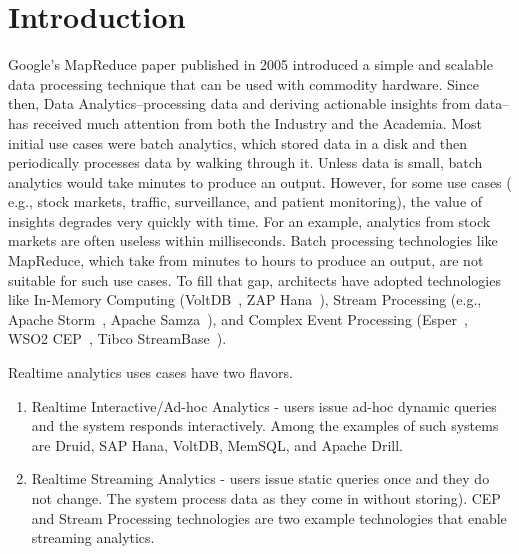 \documentclass{sig-alternate}
\begin{document}





\section{Introduction}

Google's MapReduce paper published in 2005 introduced a simple and scalable data processing technique that can be used with commodity hardware. Since then, Data Analytics--processing data and deriving actionable insights from data--has received much attention from both the Industry and the Academia.  Most initial use cases were batch analytics, which stored data in a disk and then periodically processes data by walking through it. Unless data is small, batch analytics would take minutes to produce an output. However, for some use cases ( e.g., stock markets, traffic, surveillance, and patient monitoring), the value of insights degrades very quickly with time. For an example, analytics from stock markets are often useless within milliseconds. Batch processing technologies like MapReduce, which take from minutes to hours to produce an output, are not suitable for such use cases. To fill that gap, architects have adopted technologies like In-Memory Computing (VoltDB~\cite{voltdb}, ZAP Hana~\cite{saphana}), Stream Processing (e.g., Apache Storm~\cite{storm}, Apache Samza~\cite{samza}), and Complex Event Processing (Esper~\cite{esper}, WSO2 CEP~\cite{siddhi}, Tibco StreamBase~\cite{streambase}).

Realtime analytics uses cases have two flavors.  

\begin{enumerate}
\item Realtime Interactive/Ad-hoc Analytics - users issue ad-hoc dynamic queries and the system responds interactively. Among the examples of such systems are Druid, SAP Hana, VoltDB, MemSQL, and Apache Drill. 
\item Realtime Streaming Analytics - users issue static queries once and they do not change. The system process data as they come in without storing). CEP and Stream Processing technologies are two example technologies that enable streaming analytics. 
\end{enumerate}
\end{document}
